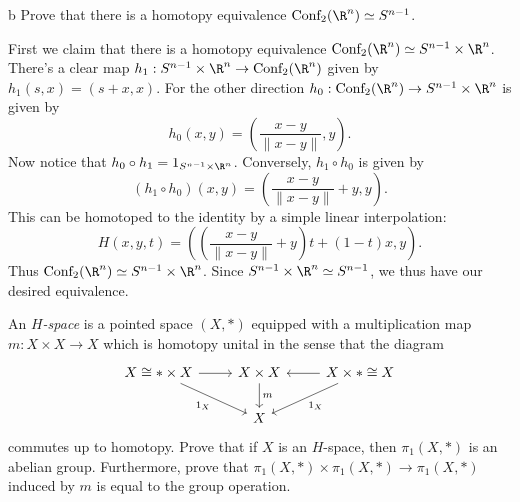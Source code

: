 \documentclass[11pt,letterpaper]{article}
\begin{document}
\begin{solution}
    \begin{partproblem}{b}
        Prove that there is a homotopy equivalence $\text{Conf}_2(\R^n)\simeq S^{n-1}$.
    \end{partproblem}
    \quad First we claim that there is a homotopy equivalence $\text{Conf}_2(\R^n)\simeq S^{n-1}\times \R^n$. There's a clear map $h_1 : S^{n-1}\times \R^n \to \text{Conf}_2(\R^n)$ given by $h_1(s,x) = (s+x, x)$. For the other direction $h_0 : \text{Conf}_2(\R^n) \to S^{n-1}\times \R^n$ is given by
    \[
        h_0(x,y) = \left(\frac{x-y}{\|x-y\|}, y\right)
    .\]
    Now notice that $h_0 \circ h_1 = 1_{S^{n-1}\times \R^n}$. Conversely, $h_1\circ h_0$ is given by 
    \[
        (h_1\circ h_0)(x,y) = \left(\frac{x-y}{\|x-y\|}+y, y\right)
    .\]
    This can be homotoped to the identity by a simple linear interpolation:
    \[
        H(x,y,t) = \left(\left(\frac{x-y}{\|x-y\|}+y\right)t + (1-t)x, y\right)
    .\] 
    \quad Thus $\text{Conf}_2(\R^n)\simeq S^{n-1}\times \R^n$. Since $S^{n-1}\times \R^n\simeq S^{n-1}$, we thus have our desired equivalence. 
\end{solution}

\begin{problem}
    An \emph{$H$-space} is a pointed space $(X, *)$ equipped with a multiplication map $m : X \times X \to X$ which is homotopy unital in the sense that the diagram
    \[\begin{tikzcd}[ampersand replacement=\&]
        {X\cong*\times X} \& {X\times X} \& {X\times *\cong X} \\
        \& X
        \arrow[from=1-1, to=1-2]
        \arrow[from=1-3, to=1-2]
        \arrow["{1_X}"', from=1-1, to=2-2]
        \arrow["{1_X}", from=1-3, to=2-2]
        \arrow["m", from=1-2, to=2-2]
    \end{tikzcd}\]
    commutes up to homotopy. Prove that if $X$ is an $H$-space, then $\pi_1(X,*)$ is an abelian group. Furthermore, prove that $\pi_1(X,*)\times \pi_1(X, *) \to \pi_1(X,*)$ induced by $m$ is equal to the group operation.
\end{problem}
\end{document}
